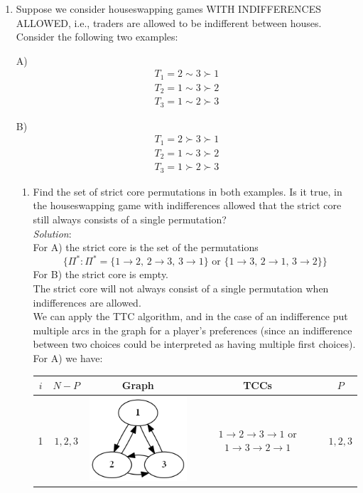 \documentclass{article}
\begin{document}
\begin{enumerate}
\begin{enumerate}
  \end{enumerate}

%
\item Suppose we consider houseswapping games WITH INDIFFERENCES ALLOWED, i.e., traders are allowed to be indifferent between houses. Consider the following two examples:

A)
\begin{align*}
T_{1} = 2 \sim 3 \succ 1 \\
T_{2} = 1 \sim 3 \succ 2 \\
T_{3} = 1 \sim 2 \succ 3
\end{align*}

B)
\begin{align*}
T_{1} = 2 \succ 3 \succ 1 \\
T_{2} = 1 \sim  3 \succ 2 \\
T_{3} = 1 \succ 2 \succ 3
\end{align*}

  \begin{enumerate}
  \item Find the set of strict core permutations in both examples. Is it true, in the houseswapping game with indifferences allowed that the strict core still always consists of a single permutation? \\

  \textit{Solution}: \\

  For A) the strict core is the set of the permutations
  \[ \{\Pi^{*}: \Pi^{*} = \{1 \rightarrow 2,\, 2 \rightarrow 3,\, 3 \rightarrow 1\} \text{ or }
                \{1 \rightarrow 3,\, 2 \rightarrow 1,\, 3 \rightarrow 2\} \} \]
  For B) the strict core is empty. \\
  The strict core will not always consist of a single permutation when indifferences are allowed. \\

  We can apply the TTC algorithm, and in the case of an indifference put multiple arcs in the graph for a player's preferences (since an indifference between two choices could be interpreted as having multiple first choices). \\

  For A) we have: \\
  \begin{tabular}{| c | c | c | c | c |}
  \hline
  $i$ & $N - P$ & Graph & TCCs & $P$ \\
  \hline\hline
  1   & $1, 2, 3$ & \includegraphics[scale=0.4]{HW06-4-A-1}
            & $1 \rightarrow 2 \rightarrow 3 \rightarrow 1$ or $1 \rightarrow 3 \rightarrow 2 \rightarrow 1$ & $1, 2, 3$ \\
  \hline
  \end{tabular} \\


\end{enumerate}
\end{enumerate}
\end{document}
